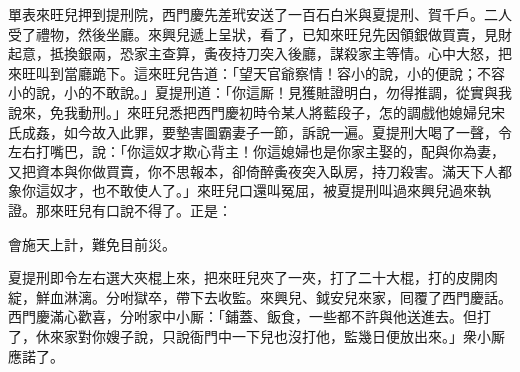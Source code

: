 單表來旺兒押到提刑院，西門慶先差玳安送了一百石白米與夏提刑、賀千戶。二人受了禮物，然後坐廳。來興兒遞上呈狀，看了，已知來旺兒先因領銀做買賣，見財起意，抵換銀兩，恐家主查算，夤夜持刀突入後廳，謀殺家主等情。心中大怒，把來旺叫到當廳跪下。這來旺兒告道：「望天官爺察情！容小的說，小的便說；不容小的說，小的不敢說。」夏提刑道：「你這厮！見獲賍證明白，勿得推調，從實與我說來，免我動刑。」來旺兒悉把西門慶初時令某人將藍段子，怎的調戲他媳婦兒宋氏成姦，如今故入此罪，要墊害圖霸妻子一節，訴說一遍。夏提刑大喝了一聲，令左右打嘴巴，說：「你這奴才欺心背主！你這媳婦也是你家主娶的，{}配與你為妻，又把資本與你做買賣，你不思報本，卻倚醉夤夜突入臥房，持刀殺害。滿天下人都象你這奴才，也不敢使人了。」來旺兒口還叫冤屈，被夏提刑叫過來興兒過來執證。那來旺兒有口說不得了。正是：

\begin{myquote}
會施天上計，難免目前災。
\end{myquote}

夏提刑即令左右選大夾棍上來，把來旺兒夾了一夾，打了二十大棍，打的皮開肉綻，鮮血淋漓。分咐獄卒，帶下去收監。來興兒、鉞安兒來家，囘覆了西門慶話。西門慶滿心歡喜，分咐家中小厮：「鋪蓋、飯食，一些都不許與他送進去。但打了，休來家對你嫂子說，只說衙門中一下兒也沒打他，監幾日便放出來。」衆小厮應諾了。

